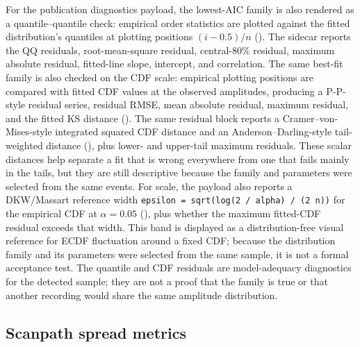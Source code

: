 \documentclass[
]{article}
\begin{document}
For the publication diagnostics payload, the lowest-AIC family is also
rendered as a quantile--quantile check: empirical order statistics are
plotted against the fitted distribution's quantiles at plotting
positions \((i - 0.5)/n\) (). The sidecar reports the QQ residuals,
root-mean-square residual, central-80\% residual, maximum absolute
residual, fitted-line slope, intercept, and correlation. The same
best-fit family is also checked on the CDF scale: empirical plotting
positions are compared with fitted CDF values at the observed
amplitudes, producing a P-P-style residual series, residual RMSE, mean
absolute residual, maximum residual, and the fitted KS distance
(). The same residual
block reports a Cramer--von-Mises-style integrated squared CDF distance
and an Anderson--Darling-style tail-weighted distance
(), plus
lower- and upper-tail maximum residuals. These scalar distances help
separate a fit that is wrong everywhere from one that fails mainly in
the tails, but they are still descriptive because the family and
parameters were selected from the same events. For scale, the payload
also reports a DKW/Massart reference width
\texttt{epsilon\ =\ sqrt(log(2\ /\ alpha)\ /\ (2\ n))} for the empirical
CDF at \(\alpha=0.05\) (),
plus whether the maximum fitted-CDF residual exceeds that width. This
band is displayed as a distribution-free visual reference for ECDF
fluctuation around a fixed CDF; because the distribution family and its
parameters were selected from the same sample, it is not a formal
acceptance test. The quantile and CDF residuals are model-adequacy
diagnostics for the detected sample; they are not a proof that the
family is true or that another recording would share the same amplitude
distribution.

\subsection{Scanpath spread metrics}\label{scanpath-spread-metrics}
\end{document}
